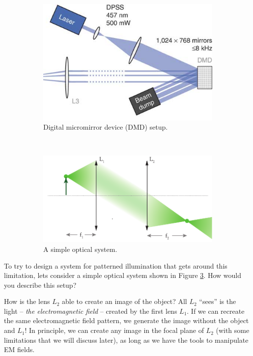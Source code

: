 \documentclass[a4paper]{report}
\begin{document}
\begin{figure}[b]
  \centering
  \begin{subfigure}[b]{0.4\textwidth}
      \includegraphics[width=1\textwidth]{dmd.png}
  \caption{Digital micromirror device (DMD) setup.}
  \label{fig:dmd}
  \end{subfigure}
  ~
  \begin{subfigure}[b]{0.55\textwidth}
      \includegraphics[width=1\textwidth]{two_lenses.pdf}
  \caption{A simple optical system.}
  \label{fig:two_lenses}  
  \end{subfigure}
  \caption{}
\end{figure}

To try to design a system for patterned illumination that gets around this limitation, lets consider a simple optical system shown in 
Figure \ref{fig:two_lenses}. How would you describe this setup? 

How is the lens $L_2$ able to create an image of the object? All $L_2$ ``sees'' is the light -- \textit{the electromagnetic field} -- created by the first lens $L_1$. If we can recreate the same electromagnetic field pattern, we generate the image without the object and $L_1$! In principle, we can create any image in the focal plane of $L_2$ (with some limitations that we will discuss later), as long as we have the tools to manipulate EM fields. 
\end{document}
